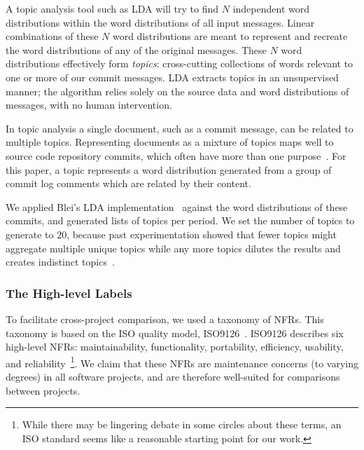 \documentclass[smallextended]{svjour3}       %
\begin{document}
A topic analysis tool such as LDA will try to find $N$ independent
word distributions within the word distributions of all input messages. 
Linear combinations of these $N$ word distributions are meant to represent and recreate the word distributions of any of the original messages. 
These $N$ word distributions effectively form \emph{topics}: cross-cutting collections of words relevant to one or more of our commit messages. 
LDA extracts topics in an unsupervised manner; the algorithm relies
solely on the source data and word distributions of messages, with no human intervention.

In topic analysis a single document, such as a commit message, can be related to multiple topics. 
Representing documents as a mixture of topics maps well to source code repository commits, which often have more than one purpose~\cite{Hindle09ICSM}.  
For this paper, a topic represents a word distribution generated from a group of commit log comments which are related by their content.  

We applied Blei's LDA implementation~\cite{Blei2003} against the word distributions of these commits, and generated lists of topics per period. 
We set the number of topics to generate to $20$, because past experimentation showed that fewer topics might aggregate multiple unique topics while
any more topics dilutes the results and creates indistinct topics~\cite{Hindle09ICSM}. 

\subsubsection{The High-level Labels}


To facilitate cross-project comparison, we used a taxonomy of NFRs. This taxonomy is based on the ISO quality model, ISO9126~\cite{iso9126}. 
ISO9126 describes six high-level NFRs: maintainability, functionality,
portability, efficiency, usability, and reliability~\footnote{While there may be lingering debate in some circles about these terms, an ISO standard
seems like a reasonable starting point for our work.}.
We claim that these NFRs are maintenance concerns (to varying degrees) in all software projects, and are therefore well-suited for comparisons between
projects.
\end{document}
